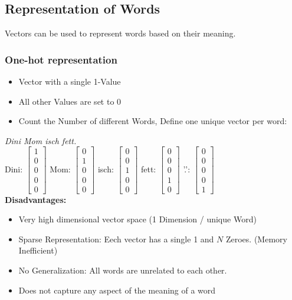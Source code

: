\subsection{Representation of Words}
Vectors can be used to represent words based on their meaning.
\subsubsection{One-hot representation}
\begin{itemize}
    \item Vector with a single 1-Value
    \item All other Values are set to 0
    \item Count the Number of different Words, Define one unique vector per word:
\end{itemize}
\textit{Dini Mom isch fett.}\\
Dini: $\begin{bmatrix} 1\\ 0\\ 0\\ 0\\ 0\end{bmatrix}$
Mom: $\begin{bmatrix} 0\\ 1\\ 0\\ 0\\ 0\end{bmatrix}$
isch: $\begin{bmatrix} 0\\ 0\\ 1\\ 0\\ 0\end{bmatrix}$
fett: $\begin{bmatrix} 0\\ 0\\ 0\\ 1\\ 0\end{bmatrix}$
'.': $\begin{bmatrix} 0\\ 0\\ 0\\ 0\\ 1\end{bmatrix}$\\ 
\textbf{Disadvantages:}
\begin{itemize}
    \item Very high dimensional vector space (1 Dimension / unique Word)
    \item Sparse Representation: Eech vector has a single 1 and $N$ Zeroes. (Memory Inefficient)
    \item No Generalization: All words are unrelated to each other.
    \item Does not capture any aspect of the meaning of a word
\end{itemize}

